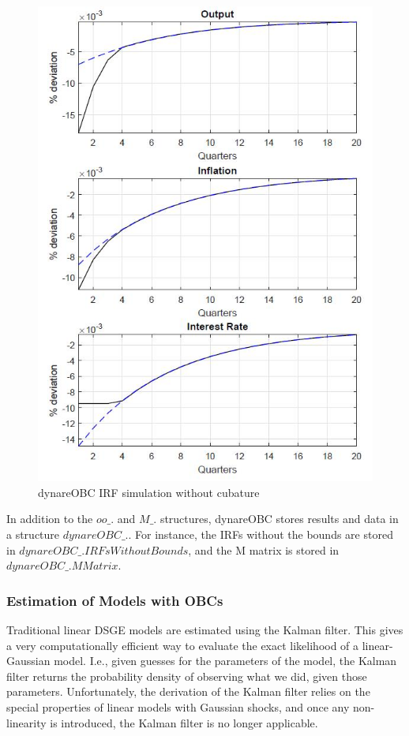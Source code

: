 \documentclass[cn,10pt,math=newtx,citestyle=gb7714-2015,bibstyle=gb7714-2015]{elegantbook}
\begin{document}
\begin{figure}[htbp!]
	\centering
	\includegraphics[width=0.8\linewidth]{FIG/dynareOBC}
	\caption{dynareOBC IRF simulation without cubature}\label{4.4}
	\centering
\end{figure}

In addition to the $oo\_.$ and $M\_.$ structures, dynareOBC stores results and data in a structure $dynareOBC\_.$. For instance, the IRFs without the bounds are stored in $dynareOBC\_.IRFsWithoutBounds$, and the M matrix is stored in $dynareOBC\_.MMatrix$.

\subsubsection{Estimation of Models with OBCs}

Traditional linear DSGE models are estimated using the Kalman filter. This gives a very computationally efficient way to evaluate the exact likelihood of a linear-Gaussian model. I.e., given guesses for the parameters of the model, the Kalman filter returns the probability density of observing what we did, given those parameters. Unfortunately, the derivation of the Kalman filter relies on the special properties of linear models with Gaussian shocks, and once any non-linearity is introduced, the Kalman filter is no longer applicable.
\end{document}
